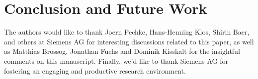 \documentclass[graybox]{svmult}
\begin{document}
\section{Conclusion and Future Work}
\label{sec:6}


\begin{acknowledgement}
The authors would like to thank Joern Pechke, Hans-Henning Klos, Shirin Baer, and others at Siemens AG for interesting discussions related to this paper, as well as Matthias Brossog, Jonathan Fuchs and Dominik Kisskalt for the insightful comments on this manuscript. Finally, we’d like to thank Siemens AG for fostering an engaging and productive research environment.

\end{acknowledgement}


\end{document}
